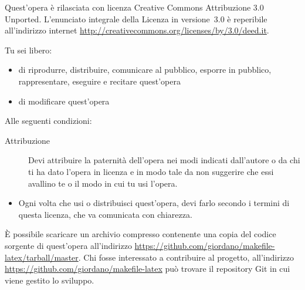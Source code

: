 \vfill

\noindent Quest'opera è rilasciata con licenza Creative Commons Attribuzione 3.0
Unported.  L'enunciato integrale della Licenza in versione~3.0 è reperibile
all'indirizzo internet \url{http://creativecommons.org/licenses/by/3.0/deed.it}.

Tu sei libero:
\begin{itemize}
\item di riprodurre, distribuire, comunicare al pubblico, esporre in pubblico,
  rappresentare, eseguire e recitare quest'opera
\item di modificare quest'opera
\end{itemize}
Alle seguenti condizioni:
\begin{description}
\item[Attribuzione] Devi attribuire la paternità dell'opera nei modi indicati
  dall'autore o da chi ti ha dato l'opera in licenza e in modo tale da non
  suggerire che essi avallino te o il modo in cui tu usi l'opera.
\end{description}

\begin{itemize}
\item Ogni volta che usi o distribuisci quest'opera, devi farlo secondo i
  termini di questa licenza, che va comunicata con chiarezza.
\end{itemize}

\vfill

È possibile scaricare un archivio compresso contenente una copia del codice
sorgente di quest'opera all'indirizzo
\url{https://github.com/giordano/makefile-latex/tarball/master}.  Chi fosse
interessato a contribuire al progetto, all'indirizzo
\url{https://github.com/giordano/makefile-latex} può trovare il repository Git
in cui viene gestito lo sviluppo.

